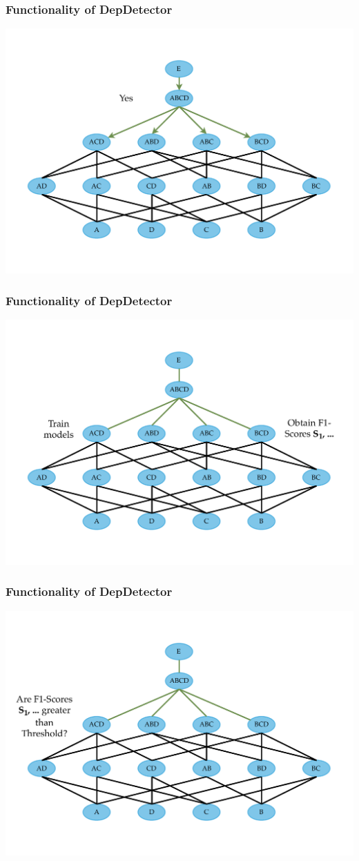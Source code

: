 \documentclass{beamer}
\begin{document}
\begin{frame}
    \frametitle{Functionality of DepDetector}
    \includegraphics[width=.95\textwidth]{min-dep-step-3.pdf}
\end{frame}

\begin{frame}
    \frametitle{Functionality of DepDetector}
    \includegraphics[width=.95\textwidth]{min-dep-step-4.pdf}
\end{frame}

\begin{frame}
    \frametitle{Functionality of DepDetector}
    \includegraphics[width=.95\textwidth]{min-dep-step-5.pdf}
\end{frame}
\end{document}
